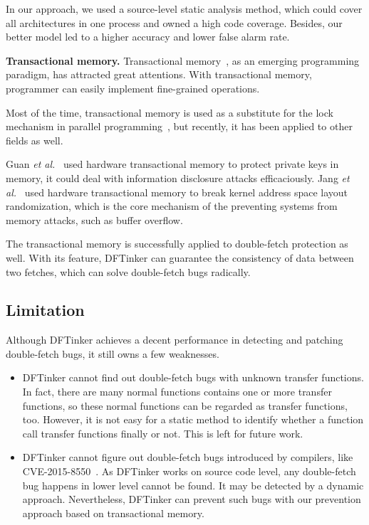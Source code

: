 \documentclass[10pt]{llncs}
\begin{document}
In our approach, we used a source-level static analysis method, which could cover all architectures in one process and owned a high code coverage. Besides, our better model led to a higher accuracy and lower false alarm rate.

\textbf{Transactional memory.} Transactional memory~\cite{Herlihy1993Transactional,Hammond2004Transactional,Harris2010Transactional}, as an emerging programming paradigm, has attracted great attentions. With transactional memory, programmer can easily implement fine-grained operations.

Most of the time, transactional memory is used as a substitute for the lock mechanism in parallel programming~\cite{Herlihy1993Transactional}, but recently, it has been applied to other fields as well.

Guan \textit{et al.}~\cite{Guan2015Protecting} used hardware transactional memory to protect private keys in memory, it could deal with information disclosure attacks efficaciously. Jang \textit{et al.}~\cite{Jang2016Breaking} used hardware transactional memory to break kernel address space layout randomization, which is the core mechanism of the preventing systems from memory attacks, such as buffer overflow.

The transactional memory is successfully applied to double-fetch protection as well. With its feature, DFTinker can guarantee the consistency of data between two fetches, which can solve double-fetch bugs radically.


\subsection{Limitation}
\label{discuss2}

Although DFTinker achieves a decent performance in detecting and patching double-fetch bugs, it still owns a few weaknesses. 
\begin{itemize}
\item DFTinker cannot find out double-fetch bugs with unknown transfer functions. In fact, there are many normal functions contains one or more transfer functions, so these normal functions can be regarded as transfer functions, too. However, it is not easy for a static method to identify whether a function call transfer functions finally or not. This is left  for future work.
\item DFTinker cannot figure out double-fetch bugs introduced by compilers, like CVE-2015-8550~\cite{wilhelm15tracing}. As DFTinker works on source code level, any double-fetch bug happens in lower level cannot be found. It may be detected by a dynamic approach. Nevertheless, DFTinker can prevent such bugs with our prevention approach based on transactional memory.
\end{itemize}
\end{document}
